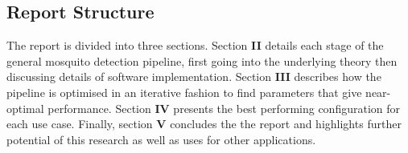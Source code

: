     \subsection{Report Structure}
    \label{subsec:bg-intro-structure}
        The report is divided into three sections. Section \textbf{II} details each stage of the general mosquito detection pipeline, first going into the underlying theory then discussing details of software implementation. Section \textbf{III} describes how the pipeline is optimised in an iterative fashion to find parameters that give near-optimal performance.
        Section \textbf{IV} presents the best performing configuration for each use case. Finally, section \textbf{V} concludes the the report and highlights further potential of this research as well as uses for other applications. 
